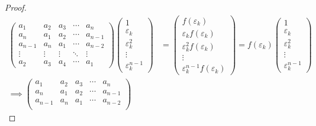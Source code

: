 \begin{proof}
    \begingroup{}
    \allowdisplaybreaks{}
    \begin{align*}
        \begin{pmatrix}
            a_{1}   & a_{2}  & a_{3}  & \cdots & a_{n}   \\
            a_{n}   & a_{1}  & a_{2}  & \cdots & a_{n-1} \\
            a_{n-1} & a_{n}  & a_{1}  & \cdots & a_{n-2} \\
            \vdots  & \vdots & \vdots & \ddots & \vdots  \\
            a_{2}   & a_{3}  & a_{4}  & \cdots & a_{1}
        \end{pmatrix}
        \begin{pmatrix}
            1                   \\
            \varepsilon_{k}     \\
            \varepsilon_{k}^{2} \\
            \vdots              \\
            \varepsilon_{k}^{n-1}
        \end{pmatrix}
         & =
        \begin{pmatrix}
            f(\varepsilon_{k})                    \\
            \varepsilon_{k}f(\varepsilon_{k})     \\
            \varepsilon_{k}^{2}f(\varepsilon_{k}) \\
            \vdots                                \\
            \varepsilon_{k}^{n-1}f(\varepsilon_{k})
        \end{pmatrix}
        = f(\varepsilon_{k})
        \begin{pmatrix}
            1                   \\
            \varepsilon_{k}     \\
            \varepsilon_{k}^{2} \\
            \vdots              \\
            \varepsilon_{k}^{n-1}
        \end{pmatrix}                   \\
        \implies
        \begin{pmatrix}
            a_{1}   & a_{2}  & a_{3}  & \cdots & a_{n}   \\
            a_{n}   & a_{1}  & a_{2}  & \cdots & a_{n-1} \\
            a_{n-1} & a_{n}  & a_{1}  & \cdots & a_{n-2} \\

\end{pmatrix}
\end{align*}
\end{proof}
